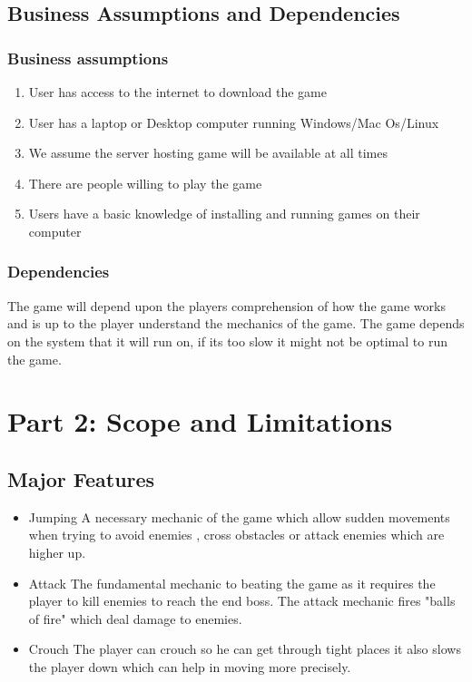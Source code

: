 \section{Business Assumptions and Dependencies}
\subsection{Business assumptions}
\begin{enumerate}
	\item User has access to the internet to download the game
	\item User has a laptop or Desktop computer running Windows/Mac Os/Linux
	\item We assume the server hosting game will be available at all times
	\item There are people willing to play the game
	\item Users have a basic knowledge of installing and running games on their computer
\end{enumerate}

\subsection{Dependencies}
The game will depend upon the players comprehension of how the game works and is up to the player understand the mechanics of the game. The game depends on the system that it will run on, if its too slow it might not be optimal to run the game.

\chapter{Part 2: Scope and Limitations}


\section{Major Features}
\begin{itemize}
    \item Jumping
    A necessary mechanic of the game which allow sudden movements when trying to avoid enemies , cross obstacles or attack enemies which are higher up.
    \item Attack
    The fundamental mechanic to beating the game as it requires the player to kill enemies to reach the end boss. The attack mechanic fires "balls of fire" which deal damage to enemies.
    \item Crouch
    The player can crouch so he can get through tight places it also slows the player down which can help in moving more precisely.
\end{itemize}
